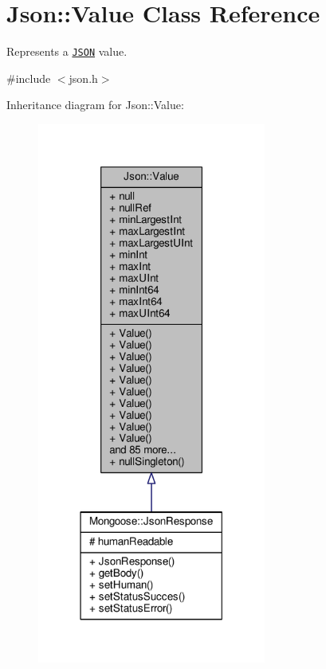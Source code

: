 \hypertarget{classJson_1_1Value}{}\section{Json\+:\+:Value Class Reference}
\label{classJson_1_1Value}


Represents a \href{http://www.json.org}{\tt J\+S\+ON} value.  




{\ttfamily \#include $<$json.\+h$>$}



Inheritance diagram for Json\+:\+:Value\+:
\nopagebreak
\begin{figure}[H]
\begin{center}
\leavevmode
\includegraphics[width=213pt]{d5/dc2/classJson_1_1Value__inherit__graph}
\end{center}
\end{figure}


